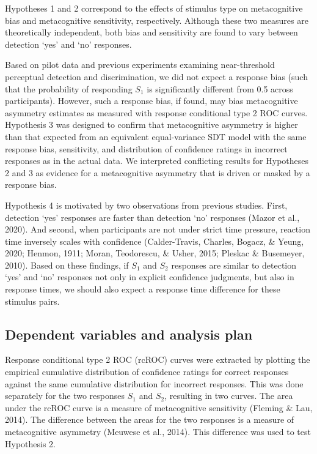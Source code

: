 \documentclass[12pt,twoside]{reedthesis}
\begin{document}
Hypotheses 1 and 2 correspond to the effects of stimulus type on metacognitive bias and metacognitive sensitivity, respectively. Although these two measures are theoretically independent, both bias and sensitivity are found to vary between detection `yes' and `no' responses.

Based on pilot data and previous experiments examining near-threshold perceptual detection and discrimination, we did not expect a response bias (such that the probability of responding \(S_1\) is significantly different from 0.5 across participants). However, such a response bias, if found, may bias metacognitive asymmetry estimates as measured with response conditional type 2 ROC curves. Hypothesis 3 was designed to confirm that metacognitive asymmetry is higher than that expected from an equivalent equal-variance SDT model with the same response bias, sensitivity, and distribution of confidence ratings in incorrect responses as in the actual data. We interpreted conflicting results for Hypotheses 2 and 3 as evidence for a metacognitive asymmetry that is driven or masked by a response bias.

Hypothesis 4 is motivated by two observations from previous studies. First, detection `yes' responses are faster than detection `no' responses (Mazor et al., 2020). And second, when participants are not under strict time pressure, reaction time inversely scales with confidence (Calder-Travis, Charles, Bogacz, \& Yeung, 2020; Henmon, 1911; Moran, Teodorescu, \& Usher, 2015; Pleskac \& Busemeyer, 2010). Based on these findings, if \(S_1\) and \(S_2\) responses are similar to detection `yes' and `no' responses not only in explicit confidence judgments, but also in response times, we should also expect a response time difference for these stimulus pairs.

\hypertarget{analysis-plan}{%
\subsection{Dependent variables and analysis plan}\label{analysis-plan}}

Response conditional type 2 ROC (rcROC) curves were extracted by plotting the empirical cumulative distribution of confidence ratings for correct responses against the same cumulative distribution for incorrect responses. This was done separately for the two responses \(S_1\) and \(S_2\), resulting in two curves. The area under the rcROC curve is a measure of metacognitive sensitivity (Fleming \& Lau, 2014). The difference between the areas for the two responses is a measure of metacognitive asymmetry (Meuwese et al., 2014). This difference was used to test Hypothesis 2.
\end{document}
